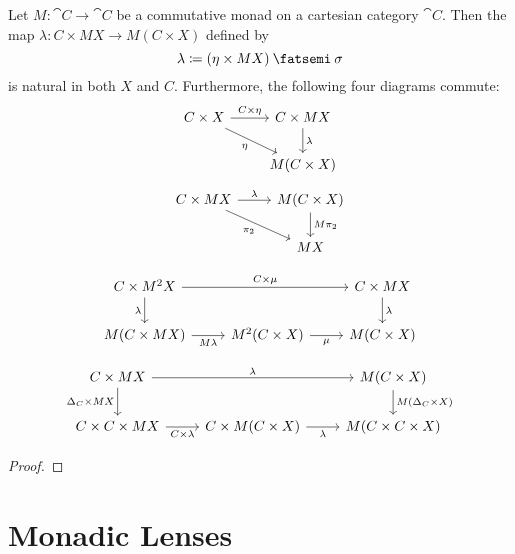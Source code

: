 \documentclass[DynamicalBook]{subfiles}
\begin{document}
\begin{lemma}\label{lem.dist_law}
Let $M : \cat{C} \to \cat{C}$ be a commutative monad on a cartesian category
$\cat{C}$. Then the map $\lambda : C \times M X \to M(C \times X)$ defined by
$$\lambda \coloneqq (\eta \times MX) \then \sigma$$
is natural in both $X$ and $C$. Furthermore, the following four diagrams
commute:
\begin{equation}
\begin{tikzcd}
C \times X \arrow[rd, "\eta"'] \arrow[r, "C \times \eta"] & C \times MX \arrow[d, "\lambda"] \\
                                                          & M(C \times X)                   
\end{tikzcd}
\end{equation}
\begin{equation}
\begin{tikzcd}
C \times MX \arrow[r, "\lambda"] \arrow[rd, "\pi_2"'] & M(C \times X) \arrow[d, "M\pi_2"] \\
                                                      & MX                               
\end{tikzcd}
\end{equation}

\begin{equation}
\begin{tikzcd}
C \times M^2X \arrow[d, "\lambda"'] \arrow[rr, "C \times \mu"] &                                   & C \times M X \arrow[d, "\lambda"] \\
M(C \times M X) \arrow[r, "M\lambda"']                          & M^2(C \times X) \arrow[r, "\mu"'] & M(C \times X)                    
\end{tikzcd}
\end{equation}

\begin{equation}
\begin{tikzcd}
C \times MX \arrow[rr, "\lambda"] \arrow[d, "\Delta_C \times MX"'] &                                              & M(C \times X) \arrow[d, "M(\Delta_C \times X)"] \\
C \times C \times MX \arrow[r, "C \times \lambda"']                & C \times M(C \times X) \arrow[r, "\lambda"'] & M(C \times C \times X)                         
\end{tikzcd}
\end{equation}
\end{lemma}
\begin{proof}

\end{proof}

\section{Monadic Lenses}
\end{document}
